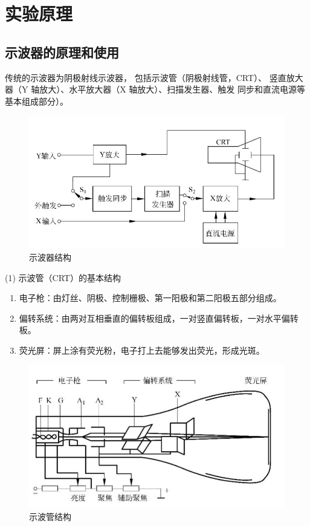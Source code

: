 \documentclass[UTF8]{ctexart}
\begin{document}
\section{实验原理}
    \subsection{示波器的原理和使用} 
    传统的示波器为阴极射线示波器， 包括示波管（阴极射线管，CRT）、
    竖直放大器（Y 轴放大）、水平放大器（X 轴放大）、扫描发生器、触发
    同步和直流电源等基本组成部分）。

    
    \begin{figure}[h]
        \centering
        \includegraphics[scale=0.4]{示波器.png}
        \caption{示波器结构}
        \label{fig:label}
    \end{figure}


    \noindent (1) 示波管（CRT）的基本结构
    \begin{enumerate}
    \item 电子枪：由灯丝、阴极、控制栅极、第一阳极和第二阳极五部分组成。

    \item 偏转系统：由两对互相垂直的偏转板组成，一对竖直偏转板，一对水平偏转板。

    \item 荧光屏：屏上涂有荧光粉，电子打上去能够发出荧光，形成光斑。
    \end{enumerate}

    \begin{figure}[h]
        \centering
        \includegraphics[scale=0.4]{示波管.png}
        \caption{示波管结构}
        \label{fig:label}
    \end{figure}
\end{document}
